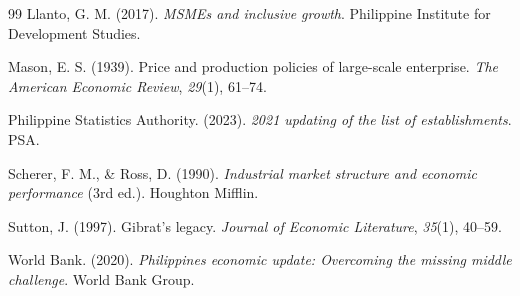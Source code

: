 \documentclass[acmtog, nonacm]{acmart}
\begin{document}
\begin{thebibliography}{99}
Llanto, G. M. (2017). \textit{MSMEs and inclusive growth}. Philippine Institute for Development Studies.

Mason, E. S. (1939). Price and production policies of large-scale enterprise. \textit{The American Economic Review}, \textit{29}(1), 61--74.

Philippine Statistics Authority. (2023). \textit{2021 updating of the list of establishments}. PSA.

Scherer, F. M., \& Ross, D. (1990). \textit{Industrial market structure and economic performance} (3rd ed.). Houghton Mifflin.

Sutton, J. (1997). Gibrat's legacy. \textit{Journal of Economic Literature}, \textit{35}(1), 40--59.

World Bank. (2020). \textit{Philippines economic update: Overcoming the missing middle challenge}. World Bank Group.

\end{thebibliography}
\end{document}
